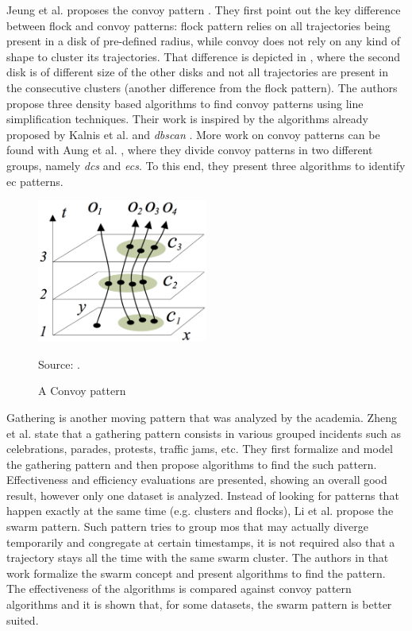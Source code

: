Jeung et al. proposes the convoy pattern \citep{convoy2}\citep{convoy}. They first point out the key difference between
flock and convoy patterns: flock pattern relies on all trajectories being present in a disk of pre-defined radius, while
convoy does not rely on any kind of shape to cluster its trajectories. That difference is depicted in
, where the second disk is of different size of the other disks and not all trajectories are
present in the consecutive clusters (another difference from the flock pattern). The authors propose three density based
algorithms to find convoy patterns using line simplification techniques. Their work is inspired by the algorithms
already proposed by Kalnis et al. \citep{movingclusters} and \textit{\ac{dbscan}} \citep{dbscan}. More work on convoy
patterns can be found with Aung et al. \citep{convoy3}, where they divide convoy patterns in two different groups,
namely \textit{\acp{dc}} and \textit{\acp{ec}}. To this end, they present three algorithms to identify \ac{ec} patterns.

\begin{figure}
    \centering
    \caption{A Convoy pattern}
    \centerline{\includegraphics[width=0.5\textwidth]{images/convoy.eps}}
    \footnotesize{Source: \citep{convoy2}.}
    \label{fig:convoy_pattern}
\end{figure}

Gathering is another moving pattern that was analyzed by the academia. Zheng et al. \citep{gathering} state that a
gathering pattern consists in various grouped incidents such as celebrations, parades, protests, traffic jams, etc. They
first formalize and model the gathering pattern and then propose algorithms to find the such pattern. Effectiveness and
efficiency evaluations are presented, showing an overall good result, however only one dataset is analyzed. Instead of
looking for patterns that happen exactly at the same time (e.g. clusters and flocks), Li et al. \citep{swarm} propose
the swarm pattern. Such pattern tries to group \acp{mo} that may actually diverge temporarily and congregate at certain
timestamps, it is not required also that a trajectory stays all the time with the same swarm cluster. The authors in
that work formalize the swarm concept and present algorithms to find the pattern. The effectiveness of the algorithms
is compared against convoy pattern algorithms and it is shown that, for some datasets, the swarm pattern is better
suited.

